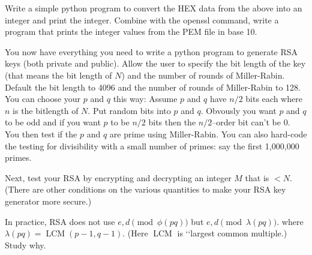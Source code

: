 \begin{ex}
  Write a simple python program to convert the HEX data
  from the above into an integer and print the integer.
  Combine with the openssl command, write a program
  that prints the integer values from the PEM file
  in base 10.
\end{ex}

\begin{comment}
s = 'aa:bb'
s = s.strip().replace('\n', '')
parts = s.split(':')
sum = 0
power = 1
for i,x in enumerate(parts[::-1]):
    sum += int(part, 16) * power
    power *= 256
\end{comment}


\begin{ex}
  You now have everything you need to write a python program to
  generate RSA keys (both private and public).
  Allow the user to specify the bit length of the key (that means 
  the bit length of $N$) and the number of rounds of Miller-Rabin.
  Default the bit length to 4096 and the number of rounds of Miller-Rabin to 128.
  You can choose your $p$ and $q$ this way:
  Assume $p$ and $q$ have $n/2$ bits each where $n$ is the bitlength of $N$.
  Put random bits into $p$ and $q$.
  Obvously you want $p$ and $q$ to be odd and if you want $p$ to be $n/2$ bits
  then the $n/2$--order bit can't be 0.
  You then test if the $p$ and $q$ are prime using Miller-Rabin.
  You can also hard-code the testing for divisibility with a small number of primes:
  say the first 1,000,000 primes.
  
  Next, test your RSA by encrypting and decrypting an integer $M$ that is $< N$.
  (There are other conditions on the various quantities to make your RSA key generator more secure.)
\end{ex}

\begin{ex}
  In practice, RSA does not use $e, d \pmod{\phi(pq)}$ but $e,d \pmod{\lambda(pq)}$.
  where
  $\lambda(pq) = \operatorname{LCM}(p - 1, q - 1)$.
  (Here $\operatorname{LCM}$ is \lq\lq largest common multiple.)
  Study why.
\end{ex}


